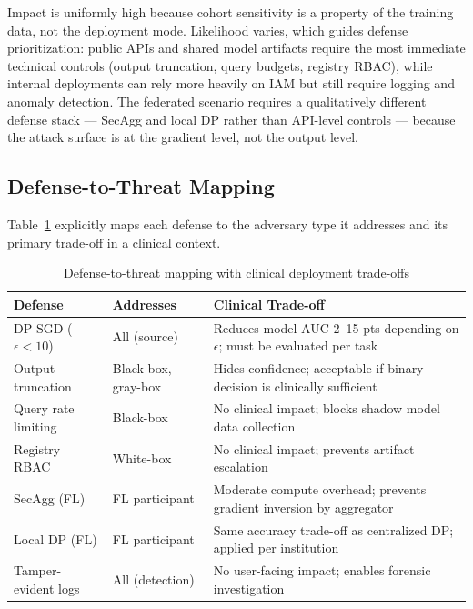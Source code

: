 \documentclass[conference]{IEEEtran}
\begin{document}
	Impact is uniformly high because cohort sensitivity is a property of the training data, not the deployment mode. Likelihood varies, which guides defense prioritization: public APIs and shared model artifacts require the most immediate technical controls (output truncation, query budgets, registry RBAC), while internal deployments can rely more heavily on IAM but still require logging and anomaly detection. The federated scenario requires a qualitatively different defense stack --- SecAgg and local DP rather than API-level controls --- because the attack surface is at the gradient level, not the output level.

	\subsection{Defense-to-Threat Mapping}
	Table~\ref{tab:defenses} explicitly maps each defense to the adversary type it addresses and its primary trade-off in a clinical context.

	\begin{table}[H]
		\centering
		\caption{Defense-to-threat mapping with clinical deployment trade-offs}
		\label{tab:defenses}
		\scriptsize
		\begin{tabularx}{\linewidth}{>{\raggedright\arraybackslash}p{1.8cm} >{\raggedright\arraybackslash}p{1.5cm} >{\raggedright\arraybackslash}X}
			\toprule
			Defense & Addresses & Clinical Trade-off \\
			\midrule
			DP-SGD ($\epsilon{<}10$) & All (source) & Reduces model AUC 2--15 pts depending on $\epsilon$; must be evaluated per task \\
			Output truncation & Black-box, gray-box & Hides confidence; acceptable if binary decision is clinically sufficient \\
			Query rate limiting & Black-box & No clinical impact; blocks shadow model data collection \\
			Registry RBAC & White-box & No clinical impact; prevents artifact escalation \\
			SecAgg (FL) & FL participant & Moderate compute overhead; prevents gradient inversion by aggregator \\
			Local DP (FL) & FL participant & Same accuracy trade-off as centralized DP; applied per institution \\
			Tamper-evident logs & All (detection) & No user-facing impact; enables forensic investigation \\
			\bottomrule
		\end{tabularx}
	\end{table}
\end{document}
